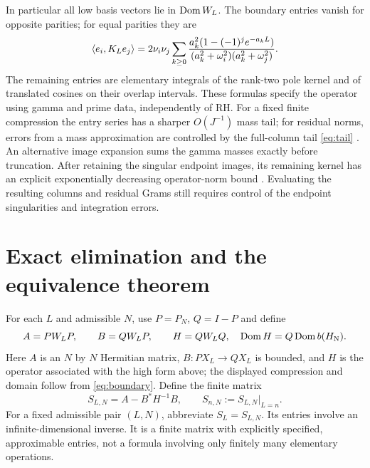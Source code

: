 In particular all low basis vectors lie in $\operatorname{Dom} W_L$. The boundary entries
vanish for opposite parities; for equal parities they are
\begin{equation}\label{eq:entries}
\langle e_i,K_Le_j\rangle=2\nu_i\nu_j\sum_{k\ge0}
\frac{a_k^2(1-(-1)^j e^{-a_kL})}
{(a_k^2+\omega_i^2)(a_k^2+\omega_j^2)}.
\end{equation}
The remaining entries are elementary integrals of the rank-two pole
kernel and of translated cosines on their overlap intervals. These formulas
specify the operator using gamma and prime data, independently of RH.
For a fixed finite compression the entry series has a sharper $O(J^{-1})$
mass tail; for residual norms, errors from a mass approximation are
controlled by the full-column tail \eqref{eq:tail}
\cite[Section 6]{Companion}.
An alternative image expansion sums the gamma masses exactly before
truncation. After retaining the singular endpoint images, its remaining
kernel has an explicit exponentially decreasing operator-norm bound
\cite[Section 5]{Companion}. Evaluating the resulting columns and residual
Grams still requires control of the endpoint singularities and integration
errors.

\section{Exact elimination and the equivalence theorem}
For each $L$ and admissible $N$, use $P=P_N$, $Q=I-P$ and define
\[
A=PW_LP,\qquad B=QW_LP,\qquad
H=QW_LQ,\quad \operatorname{Dom} H=Q\operatorname{Dom} b(H_{\rm N}).
\]
Here $A$ is an $N$ by $N$ Hermitian matrix, $B:PX_L\to QX_L$ is
bounded, and $H$ is the operator associated with the high form above;
the displayed compression and domain follow from \eqref{eq:boundary}. Define the finite matrix
\begin{equation}\label{eq:schur}
S_{L,N}=A-B^*H^{-1}B,\qquad S_{n,N}:=S_{L,N}\big|_{L=n}.
\end{equation}
For a fixed admissible pair $(L,N)$, abbreviate $S_L=S_{L,N}$.
Its entries involve an infinite-dimensional inverse. It is a finite matrix
with explicitly specified, approximable entries, not a formula involving
only finitely many elementary operations.

